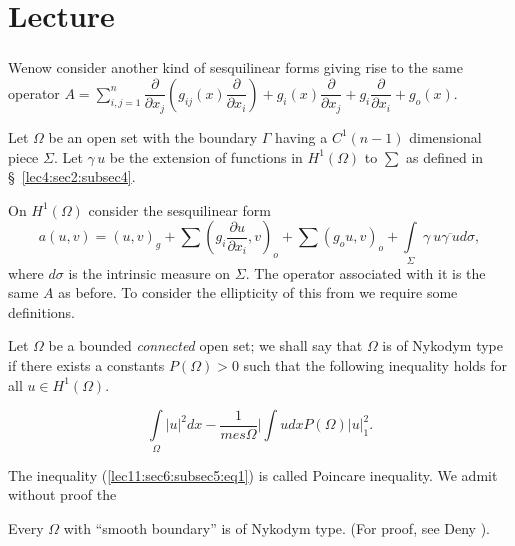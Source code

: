 
\chapter{Lecture}\label{lec11}%

\setcounter{section}{6}

\subsection{}\label{lec11:sec6:subsec5} 

We\pageoriginale now consider another kind of
sesquilinear forms giving rise to the same operator $A =
\sum\limits_{i, j=1}^n \dfrac{\partial}{\partial x_j}(g_{ij}(x)
\dfrac{\partial}{\partial x_i}) + g_i (x)\dfrac{\partial}{\partial
  x_j}+ g_i \dfrac{\partial}{\partial x_i} + g_o (x)$. 

Let $\Omega$ be an open set with the boundary $\Gamma$ having a $C^1
(n-1)$ dimensional  piece $\Sigma$. Let $\gamma \, u$ be the extension of
functions in $H^1 (\Omega)$ to $\sum$ as defined in \S\ \ref{lec4:sec2:subsec4}. 

On $H^1(\Omega)$ consider the sesquilinear form 
$$
a(u, v) = (u, v)_g+ \sum \left(g_i \dfrac{\partial u}{\partial x_i},
v\right)_o + \sum (g_o u, v)_o + \int\limits_\Sigma ~\gamma ~u
\overline{\gamma ~u}d \sigma, 
$$
 where $d \sigma$ is the intrinsic measure on $\Sigma$. The operator
 associated with it is the same $A$ as before. To consider the
 ellipticity of this from we require some definitions. 

\begin{definition}\label{lec11:sec6:subsec5:def6.1}  %
  Let $\Omega$ be a bounded {\em connected} open set; we shall say that
  $\Omega$ is of Nykodym type if there exists a constants $P(\Omega)> 0$
  such that the following inequality holds for all $u \in H^1
  (\Omega)$. 
\end{definition}

\begin{equation*}
  \int\limits_{\Omega} |u|^2 dx - \frac{1}{mes \Omega}\Big |\int u dx
  P(\Omega)|u|^2_1 . \tag{1}\label{lec11:sec6:subsec5:eq1}  
\end{equation*}

The inequality (\ref{lec11:sec6:subsec5:eq1}) is called Poincare inequality. We admit without
proof the  
\begin{theorem}\label{lec11:sec6:subsec5:thm6.7} %
  Every $\Omega$ with ``smooth boundary'' is of Nykodym type. (For
  proof, see Deny \cite{k7}). 
\end{theorem}

